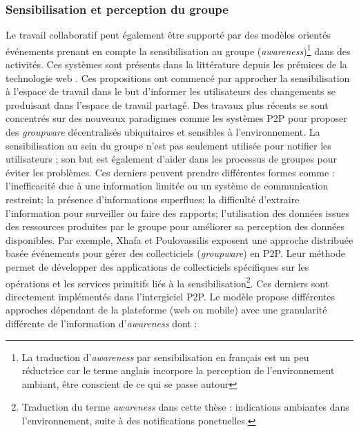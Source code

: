 \subsubsection{Sensibilisation et perception du groupe}
Le travail collaboratif peut également être supporté par des modèles orientés 
événements prenant en compte la sensibilisation au groupe (\textit{awareness})\footnote{La traduction d'\textit{awareness} par sensibilisation en français est un peu réductrice car le terme anglais incorpore la perception de l'environnement ambiant, être conscient de ce qui se passe autour} 
dans des activités. Ces systèmes sont présents dans la littérature depuis les 
prémices de la technologie web \cite{Bentley1997,Steinfield1999,You2001}. Ces 
propositions ont commencé par approcher la sensibilisation à l'espace de travail 
dans le but d'informer les utilisateurs des changements se produisant dans 
l'espace 
de travail partagé. 
Des travaux plus récents se sont concentrés sur des 
nouveaux paradigmes comme les systèmes \gls{P2P} pour proposer des 
\textit{groupware} décentralisés ubiquitaires et sensibles à l'environnement. La 
sensibilisation au sein du groupe n'est pas seulement utilisée 
pour notifier les utilisateurs ; son but est également d'aider dans les processus de 
groupes pour éviter les problèmes. Ces derniers peuvent prendre différentes 
formes comme :  l'inefficacité due à une information limitée ou un 
système de communication restreint; la présence d'informations superflues; la difficulté 
d'extraire l'information pour surveiller ou faire des rapports; l'utilisation des 
données issues des ressources produites par le groupe pour améliorer sa 
perception des données disponibles. Par exemple, Xhafa et Poulovassilis 
\cite{Xhafa2010} exposent une approche distribuée basée événements pour gérer 
des collecticiels (\textit{groupware}) en \gls{P2P}. 
Leur méthode permet de développer des applications de collecticiels spécifiques  
sur les opérations et les services primitifs liés à la sensibilisation\footnote{Traduction du terme \textit{awareness} dans cette thèse : indications ambiantes dans l'environnement, suite à des notifications ponctuelles.}. Ces derniers 
sont directement implémentés dans l'intergiciel \gls{P2P}. Le modèle propose 
différentes approches dépendant de la plateforme (web ou mobile) avec une 
granularité différente de l'information 
d'\textit{awareness} dont :

